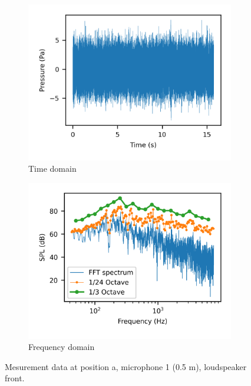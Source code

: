 \begin{figure}[H]
    \centering
    \begin{subfigure}[b]{0.48\textwidth}
        \centering
        \includegraphics{fig/time_signal.png}
        \caption{Time domain}
        \label{fig:timedomain}
    \end{subfigure}
    \begin{subfigure}[b]{0.48\textwidth}
        \centering
        \includegraphics{fig/fft_spectra.png}
        \caption{Frequency domain}
        \label{fig:frequencydomain}
    \end{subfigure}
    
    \caption{Mesurement data at position a, microphone 1 (0.5 m), loudspeaker front.}
    \label{fig:measurementsignal}
\end{figure}

